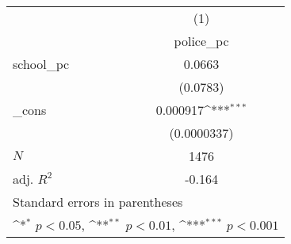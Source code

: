 {
\def\sym#1{\ifmmode^{#1}\else\(^{#1}\)\fi}
\begin{tabular}{l*{1}{c}}
\hline\hline
            &\multicolumn{1}{c}{(1)}\\
            &\multicolumn{1}{c}{police\_pc}\\
\hline
school\_pc   &      0.0663         \\
            &    (0.0783)         \\
[1em]
\_cons      &    0.000917\sym{***}\\
            & (0.0000337)         \\
\hline
\(N\)       &        1476         \\
adj. \(R^{2}\)&      -0.164         \\
\hline\hline
\multicolumn{2}{l}{\footnotesize Standard errors in parentheses}\\
\multicolumn{2}{l}{\footnotesize \sym{*} \(p<0.05\), \sym{**} \(p<0.01\), \sym{***} \(p<0.001\)}\\
\end{tabular}
}
